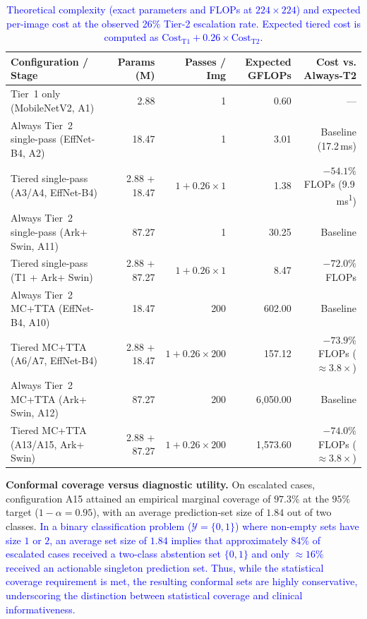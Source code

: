 \documentclass[diagnostics,article,submit,moreauthors]{Definitions/mdpi}
\newcommand{\rev}[1]{\textcolor{blue}{#1}}
\begin{document}
\begin{table}[H]
\caption{\rev{Theoretical complexity (exact parameters and FLOPs at $224{\times}224$) and expected per-image cost at the observed 26\% Tier-2 escalation rate. Expected tiered cost is computed as $\mathrm{Cost}_{\text{T1}} + 0.26 \times \mathrm{Cost}_{\text{T2}}$.}}\label{tab:efficiency}
\begin{tabular}{@{}lrrrr@{}}
\toprule
Configuration / Stage & Params (M) & Passes / Img & Expected GFLOPs & Cost vs. Always-T2\\
\midrule
Tier~1 only (MobileNetV2, A1) & 2.88 & 1 & 0.60 & ---\\
Always Tier~2 single-pass (EffNet-B4, A2) & 18.47 & 1 & 3.01 & Baseline (17.2\,ms)\\
Tiered single-pass (A3/A4, EffNet-B4) & 2.88 + 18.47 & $1 + 0.26\times 1$ & 1.38 & $-54.1\%$ FLOPs (9.9\,ms\textsuperscript{1})\\
Always Tier~2 single-pass (Ark+ Swin, A11) & 87.27 & 1 & 30.25 & Baseline\\
Tiered single-pass (T1 + Ark+ Swin) & 2.88 + 87.27 & $1 + 0.26\times 1$ & 8.47 & $-72.0\%$ FLOPs\\
\midrule
Always Tier~2 MC+TTA (EffNet-B4, A10) & 18.47 & 200 & 602.00 & Baseline\\
Tiered MC+TTA (A6/A7, EffNet-B4) & 2.88 + 18.47 & $1 + 0.26\times 200$ & 157.12 & $-73.9\%$ FLOPs ($\approx 3.8\times$)\\
Always Tier~2 MC+TTA (Ark+ Swin, A12) & 87.27 & 200 & 6,050.00 & Baseline\\
Tiered MC+TTA (A13/A15, Ark+ Swin) & 2.88 + 87.27 & $1 + 0.26\times 200$ & 1,573.60 & $-74.0\%$ FLOPs ($\approx 3.8\times$)\\
\bottomrule
\end{tabular}
\end{table}

\textbf{Conformal coverage versus diagnostic utility.} On escalated cases, configuration A15 attained an empirical marginal coverage of $97.3\%$ at the $95\%$ target ($1-\alpha=0.95$), with an average prediction-set size of $1.84$ out of two classes. \rev{In a binary classification problem ($\mathcal{Y}=\{0,1\}$) where non-empty sets have size $1$ or $2$, an average set size of $1.84$ implies that approximately $84\%$ of escalated cases received a two-class abstention set $\{0,1\}$ and only $\approx 16\%$ received an actionable singleton prediction set. Thus, while the statistical coverage requirement is met, the resulting conformal sets are highly conservative, underscoring the distinction between statistical coverage and clinical informativeness.}
\end{document}
